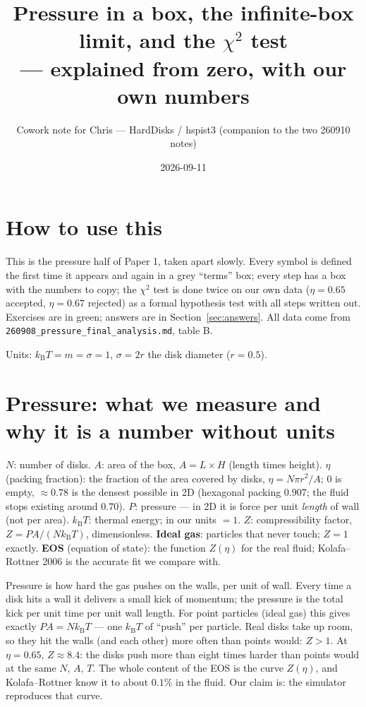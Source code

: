 \documentclass[11pt,a4paper]{article}
\title{Pressure in a box, the infinite-box limit, and the $\chi^2$ test\\ --- explained from zero, with our own numbers}
\author{Cowork note for Chris --- HardDisks / hspist3 (companion to the two 260910 notes)}
\date{2026-09-11}
\newcommand{\kT}{k_{\mathrm B}T}
\begin{document}
\maketitle

\section*{How to use this}
This is the pressure half of Paper 1, taken apart slowly. Every symbol is defined the first time it appears and again in a grey ``terms'' box; every step has a box with the numbers to copy; the $\chi^2$ test is done twice on our own data ($\eta = 0.65$ accepted, $\eta = 0.67$ rejected) as a formal hypothesis test with all steps written out. Exercises are in green; answers are in Section~\ref{sec:answers}. All data come from \texttt{260908\_pressure\_final\_analysis.md}, table B.

Units: $\kT = m = \sigma = 1$, $\sigma = 2r$ the disk diameter ($r = 0.5$).

\tableofcontents

\section{Pressure: what we measure and why it is a number without units}

\begin{term}
\textbf{$N$}: number of disks. \textbf{$A$}: area of the box, $A = L\times H$ (length times height). \textbf{$\eta$} (packing fraction): the fraction of the area covered by disks, $\eta = N\pi r^2/A$; $0$ is empty, $\approx0.78$ is the densest possible in 2D (hexagonal packing $0.907$; the fluid stops existing around $0.70$). \textbf{$P$}: pressure --- in 2D it is force per unit \emph{length} of wall (not per area). \textbf{$\kT$}: thermal energy; in our units $= 1$. \textbf{$Z$}: compressibility factor, $Z = PA/(N\kT)$, dimensionless. \textbf{Ideal gas}: particles that never touch; $Z = 1$ exactly. \textbf{EOS} (equation of state): the function $Z(\eta)$ for the real fluid; Kolafa--Rottner 2006 is the accurate fit we compare with.
\end{term}

\begin{eli}
Pressure is how hard the gas pushes on the walls, per unit of wall. Every time a disk hits a wall it delivers a small kick of momentum; the pressure is the total kick per unit time per unit wall length. For point particles (ideal gas) this gives exactly $PA = N\kT$ --- one $\kT$ of ``push'' per particle. Real disks take up room, so they hit the walls (and each other) more often than points would: $Z>1$. At $\eta = 0.65$, $Z\approx8.4$: the disks push more than eight times harder than points would at the same $N$, $A$, $T$. The whole content of the EOS is the curve $Z(\eta)$, and Kolafa--Rottner know it to about $0.1\%$ in the fluid. Our claim is: the simulator reproduces that curve.
\end{eli}
\end{document}
